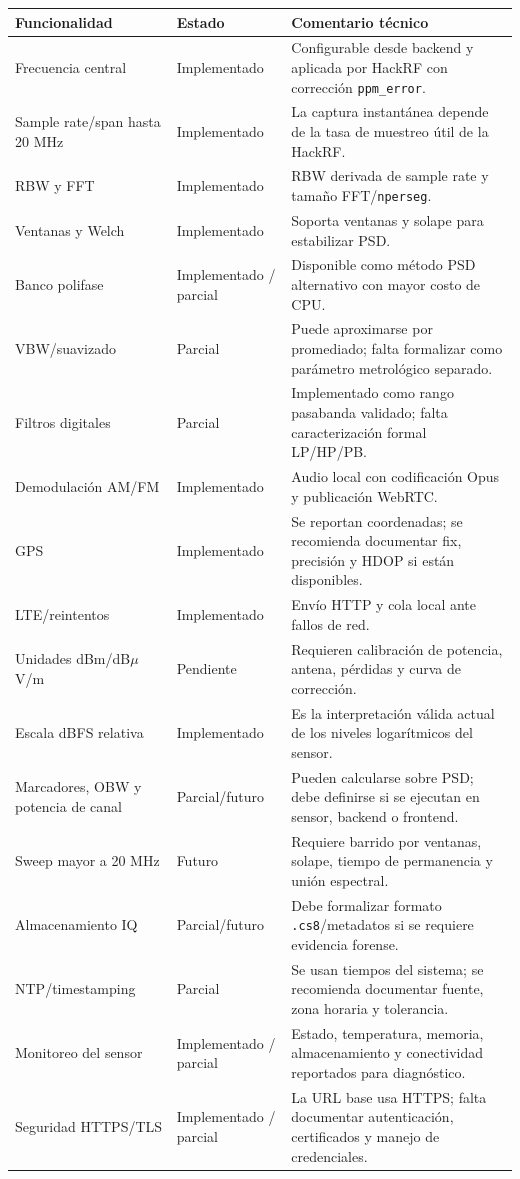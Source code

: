 \begin{longtable}{p{}p{}p{}}
\toprule
\textbf{Funcionalidad} & \textbf{Estado} & \textbf{Comentario técnico} \\
\midrule
\endhead
Frecuencia central & Implementado & Configurable desde backend y aplicada por HackRF con corrección \texttt{ppm\_error}. \\
Sample rate/span hasta 20 MHz & Implementado & La captura instantánea depende de la tasa de muestreo útil de la HackRF. \\
RBW y FFT & Implementado & RBW derivada de sample rate y tamaño FFT/\texttt{nperseg}. \\
Ventanas y Welch & Implementado & Soporta ventanas y solape para estabilizar PSD. \\
Banco polifase & Implementado / parcial & Disponible como método PSD alternativo con mayor costo de CPU. \\
VBW/suavizado & Parcial & Puede aproximarse por promediado; falta formalizar como parámetro metrológico separado. \\
Filtros digitales & Parcial & Implementado como rango pasabanda validado; falta caracterización formal LP/HP/PB. \\
Demodulación AM/FM & Implementado & Audio local con codificación Opus y publicación WebRTC. \\
GPS & Implementado & Se reportan coordenadas; se recomienda documentar fix, precisión y HDOP si están disponibles. \\
LTE/reintentos & Implementado & Envío HTTP y cola local ante fallos de red. \\
Unidades dBm/dB$\mu$V/m & Pendiente & Requieren calibración de potencia, antena, pérdidas y curva de corrección. \\
Escala dBFS relativa & Implementado & Es la interpretación válida actual de los niveles logarítmicos del sensor. \\
Marcadores, OBW y potencia de canal & Parcial/futuro & Pueden calcularse sobre PSD; debe definirse si se ejecutan en sensor, backend o frontend. \\
Sweep mayor a 20 MHz & Futuro & Requiere barrido por ventanas, solape, tiempo de permanencia y unión espectral. \\
Almacenamiento IQ & Parcial/futuro & Debe formalizar formato \texttt{.cs8}/metadatos si se requiere evidencia forense. \\
NTP/timestamping & Parcial & Se usan tiempos del sistema; se recomienda documentar fuente, zona horaria y tolerancia. \\
Monitoreo del sensor & Implementado / parcial & Estado, temperatura, memoria, almacenamiento y conectividad reportados para diagnóstico. \\
Seguridad HTTPS/TLS & Implementado / parcial & La URL base usa HTTPS; falta documentar autenticación, certificados y manejo de credenciales. \\
\bottomrule
\end{longtable}



